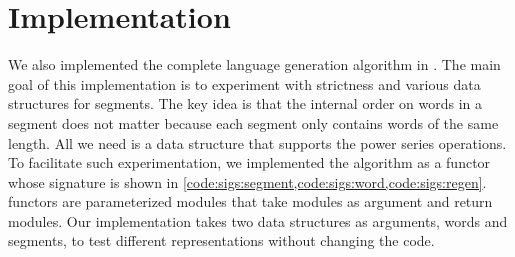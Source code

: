 \section{\ocaml Implementation}
\label{sec:ocaml}

\lstset{language=[Objective]Caml}

We also implemented the complete
language generation algorithm in \ocaml.
The main goal of this implementation is to experiment with strictness
and various data structures for segments. 
The key idea is that the internal order on words in a segment does not matter
because each segment only contains words of the same length.
All we need is a data structure that supports the power series
operations.
%
To facilitate such experimentation, we implemented the
algorithm as a functor whose signature is shown in
\cref{code:sigs:segment,code:sigs:word,code:sigs:regen}.
\ocaml{} functors are parameterized modules that take modules
as argument and return modules. Our implementation
takes two data structures as arguments, words and segments,
to test different representations without changing
the code.

